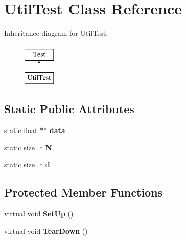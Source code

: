 \hypertarget{classUtilTest}{\section{Util\-Test Class Reference}
\label{classUtilTest}
}
Inheritance diagram for Util\-Test\-:\begin{figure}[H]
\begin{center}
\leavevmode
\includegraphics[height=2.000000cm]{classUtilTest}
\end{center}
\end{figure}
\subsection*{Static Public Attributes}
\begin{DoxyCompactItemize}
\item 
\hypertarget{classUtilTest_a118c726b8f2fa0dc658e9c47e74329ae}{static float $\ast$$\ast$ {\bfseries data}}\label{classUtilTest_a118c726b8f2fa0dc658e9c47e74329ae}

\item 
\hypertarget{classUtilTest_a9787e7050dd6ff373e5db8b22458a4cf}{static size\-\_\-t {\bfseries N}}\label{classUtilTest_a9787e7050dd6ff373e5db8b22458a4cf}

\item 
\hypertarget{classUtilTest_a057d5a757ef3cef5554e6b438f8f0495}{static size\-\_\-t {\bfseries d}}\label{classUtilTest_a057d5a757ef3cef5554e6b438f8f0495}

\end{DoxyCompactItemize}
\subsection*{Protected Member Functions}
\begin{DoxyCompactItemize}
\item 
\hypertarget{classUtilTest_a8f67bdc9dd37ff9fd862f66ddfb863cb}{virtual void {\bfseries Set\-Up} ()}\label{classUtilTest_a8f67bdc9dd37ff9fd862f66ddfb863cb}

\item 
\hypertarget{classUtilTest_a38fecea095d1c8f8bd55c86292425081}{virtual void {\bfseries Tear\-Down} ()}\label{classUtilTest_a38fecea095d1c8f8bd55c86292425081}

\end{DoxyCompactItemize}
